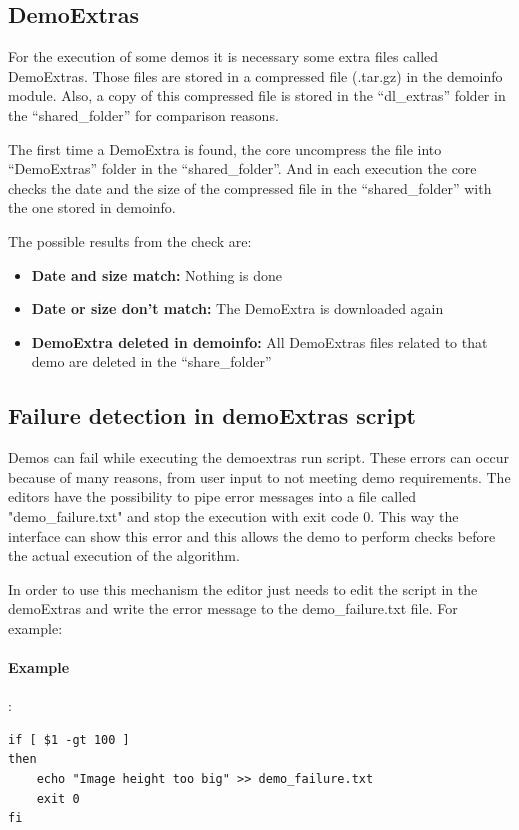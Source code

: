 \subsection{DemoExtras}

For the execution of some demos it is necessary some extra files called DemoExtras. Those files are stored in a compressed file (.tar.gz)
in the demoinfo module. Also, a copy of this compressed file is stored in the ``dl\_extras'' folder in the ``shared\_folder'' for comparison
reasons.

The first time a DemoExtra is found, the core uncompress the file into ``DemoExtras'' folder in the ``shared\_folder''. And in each execution
the core checks the date and the size of the compressed file in the ``shared\_folder'' with the one stored in demoinfo.

The possible results from the check are:
\begin{itemize}
 \item \textbf{Date and size match:} Nothing is done
 \item \textbf{Date or size don't match:} The DemoExtra is downloaded again
 \item \textbf{DemoExtra deleted in demoinfo:} All DemoExtras files related to that demo are deleted in the ``share\_folder''
\end{itemize}

\subsection{Failure detection in demoExtras script}

Demos can fail while executing the demoextras run script. These errors can occur because of many reasons, from user input to not meeting demo 
requirements. The editors have the possibility to pipe error messages into a file called "demo\_failure.txt" and stop the execution with exit
code 0. This way the interface can show this error and this allows the demo to perform checks before the actual execution of the algorithm.

In order to use this mechanism the editor just needs to edit the script in the demoExtras and write the error message to the demo_failure.txt file. 
For example:
\paragraph{Example}:\\
\begin{verbatim}
if [ $1 -gt 100 ]
then
    echo "Image height too big" >> demo_failure.txt
    exit 0
fi
\end{verbatim} 